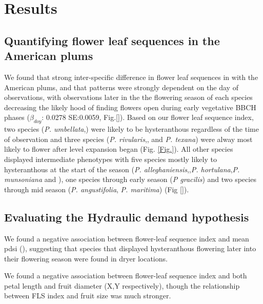 \documentclass{article}\usepackage[]{graphicx}\usepackage[]{color}
\begin{document}



\section*{Results}
\subsection*{Quantifying flower leaf sequences in the American plums}
We found that strong inter-specific difference in flower leaf sequences in with the American plums, and that patterns were strongly dependent on the day of observations, with observations later in the the flowering season of each species decreasing the likely hood of finding flowers open during early vegetative BBCH phases ($\beta_{doy}$: 0.0278 SE:0.0059, Fig.\ref{}). Based on our flower leaf sequence index, two species (\textit{P. umbellata},) were likely to be hysteranthous regardless of the time of observation and three species (\textit{P. rivularis},, and \textit{P. texana}) were alway most likely to flower after level expansion began (Fig. \ref{Fig.}). All other species displayed intermediate phenotypes with five species mostly likely to hysteranthous at the start of the season (\textit{P. alleghaniensis},,\textit{P. hortulana},\textit{P. munsoniana} and ), one species through early season (\textit{P gracilis}) and two species through mid season (\textit{P. angustifolia}, \textit{P. maritima}) (Fig \ref{}).

\subsection*{Evaluating the Hydraulic demand hypothesis}
We found a negative association between flower-leaf sequence index and mean pdsi (), suggesting that species that displayed hysteranthous flowering later into their flowering season were found in dryer locations. 

We found a negative association between flower-leaf sequence index and both  petal length and fruit diameter (X,Y respectively), though the relationship between FLS index and fruit size was much stronger.
\end{document}

